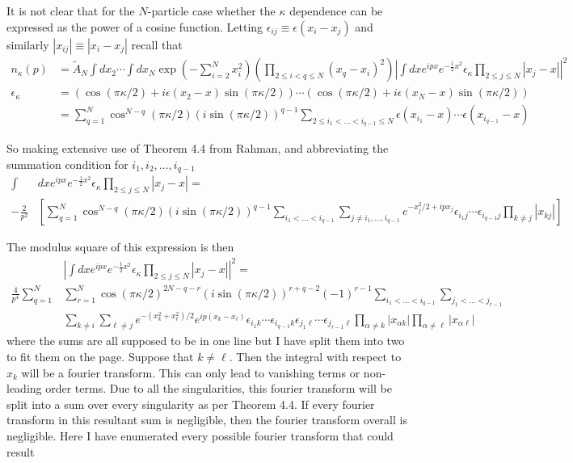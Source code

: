 \documentclass[onecolumn,english,aps,pra]{revtex4}
\begin{document}
It is not clear that for the $N$-particle case whether the $\kappa$ dependence can be expressed as the power of a cosine function. Letting $\epsilon_{ij} \equiv \epsilon(x_{i} - x_{j}) $ and similarly $|x_{ij}| \equiv |x_{i} - x_{j}|$ recall that
%
\begin{align*}
n_{\kappa}(p) & = \tilde{A}_{N} \int dx_{2} \cdots \int dx_{N} \exp\left(- \sum_{i = 2}^{N} x_{i}^2\right) \left( \prod_{2 \leq i < q \leq N} (x_{q} - x_{i})^2 \right)
	\left| \int dx e^{i p x} e^{-\frac{1}{2} x^2} \epsilon_{\kappa} \prod_{2 \leq j \leq N} |x_{j} - x| \right|^2\\
\epsilon_{\kappa} & =  \left(\cos(\pi \kappa/2) + i\epsilon(x_{2} - x)\sin(\pi \kappa/2) \right) 
\cdots \left(\cos(\pi \kappa/2) + i\epsilon(x_{N} - x)\sin(\pi \kappa/2)\right)\\
& = \sum_{q = 1}^{N} \cos^{N-q}(\pi \kappa /2) (i \sin(\pi \kappa /2))^{q-1}
\sum_{2\leq i_{1} < \ldots < i_{q - 1} \leq N} \epsilon(x_{i_{1}} - x) \cdots \epsilon(x_{i_{q-1}} - x)
\end{align*}

So making extensive use of Theorem 4.4 from Rahman, and abbreviating the summation condition for $i_{1}, i_{2}, \ldots, i_{q - 1}$
\begin{align*}
\int & dx e^{i p x} e^{-\frac{1}{2} x^2} \epsilon_{\kappa} \prod_{2 \leq j \leq N} |x_{j} - x| =\\
-\frac{2}{p^2}& \left[ \sum_{q = 1}^{N} \cos^{N-q}(\pi \kappa /2) (i \sin(\pi \kappa /2))^{q-1}
 \sum_{i_{1} < \ldots < i_{q - 1}} \sum_{j \neq i_{1}, \ldots, i_{q-1}} e^{-x_{j}^2/2 + ipx_{j}} \epsilon_{i_{1}j} \cdots \epsilon_{i_{q-1}j} \prod_{k \neq j} |x_{kj}| \right]
\end{align*}

The modulus square of this expression is then
\begin{align*}
 & \left| \int dx e^{i p x}  e^{-\frac{1}{2} x^2} \epsilon_{\kappa} \prod_{2 \leq j \leq N} |x_{j} - x| \right|^2 =\\
\frac{4}{p^4}  \sum_{q = 1}^{N} & \sum_{r = 1}^{N} \cos(\pi \kappa /2)^{2N-q-r} (i \sin(\pi \kappa /2))^{r+q-2} (-1)^{r-1} 
\sum_{i_{1} < \ldots < i_{q - 1}} \sum_{j_{1} < \ldots < j_{r - 1}}\\
&\sum_{k \neq i} 
\sum_{\ell \neq j} 
e^{-(x_{k}^{2} + x_{\ell}^{2})/2} e^{ip(x_{k} - x_{\ell})} 
\epsilon_{i_{1}k} \cdots \epsilon_{i_{q-1}k}
\epsilon_{j_{1}\ell} \cdots \epsilon_{j_{r-1}\ell}
\prod_{\alpha \neq k} |x_{\alpha k}|
\prod_{\alpha \neq \ell} |x_{\alpha \ell}|
\end{align*}
where the sums are all supposed to be in one line but I have split them into two to fit them on the page. Suppose that $k \neq \ell$. Then the integral with respect to $x_{k}$ will be a fourier transform. This can only lead to vanishing terms or non-leading order terms. Due to all the singularities, this fourier transform will be split into a sum over every singularity as per Theorem 4.4. If every fourier transform in this resultant sum is negligible, then the fourier transform overall is negligible. Here I have enumerated every possible fourier transform that could result
\end{document}
